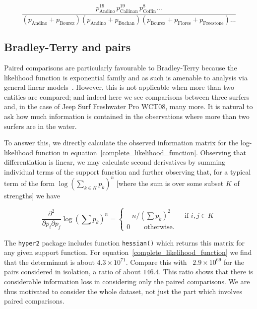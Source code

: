 \documentclass{article}
\begin{document}
\begin{equation}\label{complete_likelihood_function}
\frac{
p_\mathrm{Andino}^{19}\, p_\mathrm{Callinan}^{19}\, p_\mathrm{Coffin}^{8}\ldots
}{
(p_\mathrm{Andino} + p_\mathrm{Bourez})  (p_\mathrm{Andino} + p_\mathrm{Buchan})(p_\mathrm{Bourez} + p_\mathrm{Flores} + p_\mathrm{Freestone})\ldots
}
\end{equation}


\subsection{Bradley-Terry and pairs}

Paired comparisons are particularly favourable to Bradley-Terry
because the likelihood function is exponential family and as such is
amenable to analysis via general linear models~\citep{turner2012}.
However, this is not applicable when more than two entities are
compared; and indeed here we see comparisons between three surfers
and, in the case of Jeep Surf Freshwater Pro WCT08, many more.  It
is natural to ask how much information is contained in the
observations where more than two surfers are in the water.

To answer this, we directly calculate the observed information matrix
for the log-likelihood function in
equation~\ref{complete_likelihood_function}.  Observing that
differentiation is linear, we may calculate second derivatives by
summing individual terms of the support function and further observing
that, for a typical term of the form $\log\left(\sum_{k\in K}
p_k\right)^n$ [where the sum is over some subset $K$ of strengths] we
have

\begin{equation}
  \frac{\partial^2}{\partial p_i\partial p_j}
  \log\left(\sum p_k\right)^n=
  \begin{cases}
    -n/\left(\sum p_k\right)^2\qquad\mbox{if $i,j\in K$}\\
    0\qquad\mbox{otherwise.}
    \end{cases}
\end{equation}

The {\tt hyper2} package includes function {\tt hessian()} which
returns this matrix for any given support function.  For
equation~\ref{complete_likelihood_function} we find that the
determinant is about $4.3\times 10^{71}$.  Compare this with
~$2.9\times 10^{69}$ for the pairs considered in isolation, a ratio of
about $146.4$.  This ratio shows that there is considerable
information loss in considering only the paired comparisons.  We are
thus motivated to consider the whole dataset, not just the part which
involves paired comparisons.
\end{document}
